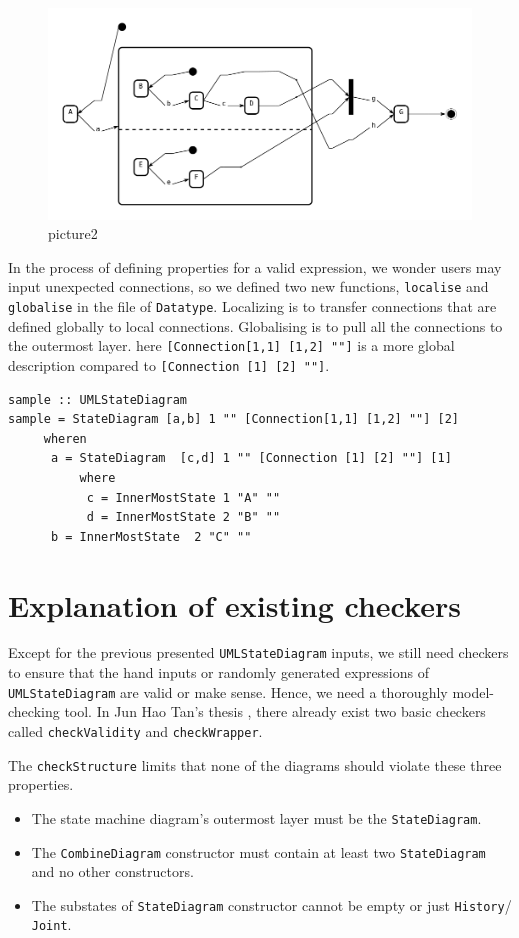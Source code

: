 \begin{figure}[ht]
    \centering
    \includegraphics[scale=0.40]{Bilder/slide279.png}
    \caption{picture2}
    \label{fig:picture2}
\end{figure}
In the process of defining properties for a valid expression, we wonder users may input unexpected connections, so we defined two new functions, \verb|localise| and \verb|globalise| in the file of \verb|Datatype|.
Localizing is to transfer connections that are defined globally to local connections. Globalising is to pull all the connections to the outermost layer.
here \verb|[Connection[1,1] [1,2] ""]| is a more global description compared to \verb|[Connection [1] [2] ""]|.
\begin{verbatim}
sample :: UMLStateDiagram
sample = StateDiagram [a,b] 1 "" [Connection[1,1] [1,2] ""] [2]
     wheren
      a = StateDiagram  [c,d] 1 "" [Connection [1] [2] ""] [1]
          where
           c = InnerMostState 1 "A" ""
           d = InnerMostState 2 "B" ""
      b = InnerMostState  2 "C" ""
\end{verbatim}
\newpage

\section{Explanation of existing checkers}
\label{sec:existingCheckers}
Except for the previous presented \verb|UMLStateDiagram| inputs, we still need checkers to ensure that the hand inputs or randomly generated expressions of \verb|UMLStateDiagram| are valid or make sense. 
Hence, we need a thoroughly model-checking tool.
In Jun Hao Tan's thesis \cite{jun_hao_tan}, there already exist two basic checkers called \verb|checkValidity| and \verb|checkWrapper|.

The \verb|checkStructure| limits that none of the diagrams should violate these three properties.
\begin{itemize}
\item  The state machine diagram's outermost layer must be the \verb|StateDiagram|.
\end{itemize}
\begin{itemize}
\item  The \verb|CombineDiagram| constructor must contain at least two \verb|StateDiagram| and no other constructors.
\end{itemize}
\begin{itemize}
\item  The substates of \verb|StateDiagram| constructor cannot be empty or just \verb|History|/ \verb|Joint|.
\end{itemize}

